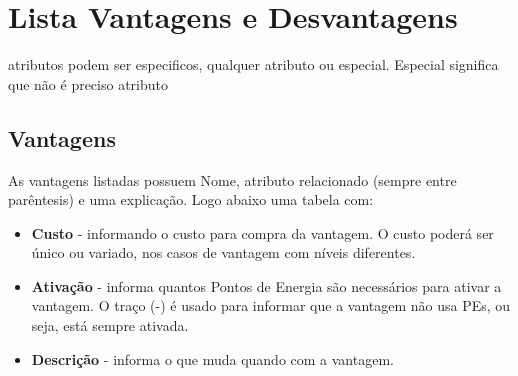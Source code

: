 \chapter{\label{apendiceVantagensDesvantagens}Lista Vantagens e Desvantagens}

atributos podem ser especificos, qualquer atributo ou especial. Especial significa que não é preciso atributo

\section*{Vantagens}
As vantagens listadas possuem Nome, atributo relacionado (sempre entre parêntesis) e uma explicação. Logo abaixo uma tabela com:
\begin{itemize}
	\item \textbf{Custo} - informando o custo para compra da vantagem. O custo poderá ser único ou variado, nos casos de vantagem com níveis diferentes.
	\item \textbf{Ativação} - informa quantos Pontos de Energia são necessários para ativar a vantagem. O traço (-) é usado para informar que a vantagem não usa PEs, ou seja, está sempre ativada.
	\item \textbf{Descrição} - informa o que muda quando com a vantagem.
\end{itemize}


